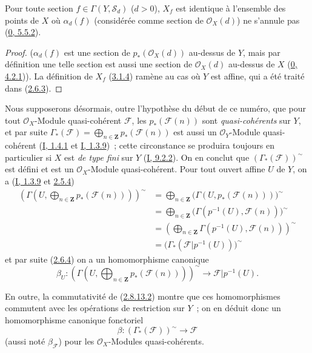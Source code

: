 \begin{proposition}[3.3.3]
\label{II.3.3.3-fr}
Pour toute section $f\in\Gamma(Y,\mathcal{S}_d)$ ($d>0$), $X_f$ est identique
à l'ensemble des points de $X$ où $\alpha_d(f)$ (considérée comme section de
$\mathcal{O}_X(d)$) ne s'annule pas
(\hyperref[0.5.5.2-fr]{0, 5.5.2}).
\end{proposition}

\begin{proof}
($\alpha_d(f)$ est une section de $p_*(\mathcal{O}_X(d))$ au-dessus de $Y$,
mais par définition une telle section est aussi une section de
$\mathcal{O}_X(d)$ au-dessus de $X$
(\hyperref[0.4.2.1-fr]{0, 4.2.1})). La définition de $X_f$
(\hyperref[II.3.1.4-fr]{3.1.4}) ramène au cas où $Y$ est affine, qui a été
traité dans (\hyperref[II.2.6.3-fr]{2.6.3}).
\end{proof}

\begin{env}[3.3.4]
\label{II.3.3.4-fr}
Nous supposerons désormais, outre l'hypothèse du début de ce numéro, que pour
tout $\mathcal{O}_X$-Module quasi-cohérent $\mathcal{F}$, les
$p_*(\mathcal{F}(n))$ sont \emph{quasi-cohérents} sur $Y$, et par suite
$\Gamma_*(\mathcal{F})=\bigoplus_{n\in\mathbf{Z}}p_*(\mathcal{F}(n))$ est
aussi un $\mathcal{O}_Y$-Module quasi-cohérent
(\hyperref[I.1.4.1-fr]{I, 1.4.1} et
\hyperref[I.1.3.9-fr]{I, 1.3.9})~; cette circonstance se produira toujours en
particulier si $X$ est \emph{de type fini} sur $Y$
(\hyperref[I.9.2.2-fr]{I, 9.2.2}). On en conclut que
$(\Gamma_*(\mathcal{F}))^{\sim}$ est défini et est un
$\mathcal{O}_X$-Module quasi-cohérent. Pour tout ouvert affine $U$ de $Y$, on
a (\hyperref[I.1.3.9-fr]{I, 1.3.9} et
\hyperref[II.2.5.4-fr]{2.5.4})
\begin{align*}
  \left(\Gamma\left(U,\bigoplus_{n\in\mathbf{Z}}
  p_*(\mathcal{F}(n))\right)\right)^{\sim}
  &=\bigoplus_{n\in\mathbf{Z}}
  \bigl(\Gamma(U,p_*(\mathcal{F}(n)))\bigr)^{\sim}\\
  &=\bigoplus_{n\in\mathbf{Z}}
  \bigl(\Gamma(p^{-1}(U),\mathcal{F}(n))\bigr)^{\sim}\\
  &=\left(\bigoplus_{n\in\mathbf{Z}}
  \Gamma(p^{-1}(U),\mathcal{F}(n))\right)^{\sim}\\
  &=\bigl(\Gamma_*(\mathcal{F}|p^{-1}(U))\bigr)^{\sim}
\end{align*}
et par suite (\hyperref[II.2.6.4-fr]{2.6.4}) on a un homomorphisme canonique
\[
  \beta_U:\left(\Gamma\left(U,\bigoplus_{n\in\mathbf{Z}}
  p_*(\mathcal{F}(n))\right)\right)^{\sim}
  \longrightarrow\mathcal{F}|p^{-1}(U).
\]

En outre, la commutativité de
(\hyperref[II.2.8.13.2-fr]{2.8.13.2}) montre que ces homomorphismes commutent
avec les opérations de restriction sur $Y$~; on en déduit donc un
homomorphisme canonique fonctoriel
\[
\label{II.3.3.4.1-fr}
  \beta:(\Gamma_*(\mathcal{F}))^{\sim}\longrightarrow\mathcal{F}
\tag{3.3.4.1}
\]
(aussi noté $\beta_{\mathcal{F}}$) pour les $\mathcal{O}_X$-Modules
quasi-cohérents.
\end{env}

